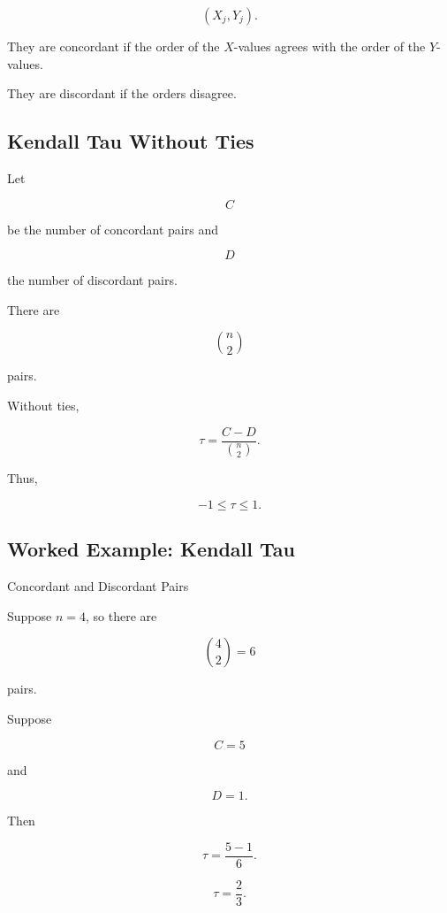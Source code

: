 \[
(X_j,Y_j).
\]

They are concordant if the order of the \(X\)-values agrees with the
order of the \(Y\)-values.

They are discordant if the orders disagree.

\subsection{Kendall Tau Without Ties}
\label{subsec:kendall-no-ties}

Let

\[
C
\]

be the number of concordant pairs and

\[
D
\]

the number of discordant pairs.

There are

\[
\binom{n}{2}
\]

pairs.

Without ties,

\[
\boxed{
\tau
=
\frac{
C-D
}{
\binom{n}{2}
}.
}
\]

Thus,

\[
-1\leq\tau\leq1.
\]

\subsection{Worked Example: Kendall Tau}
\label{subsec:worked-kendall}

\begin{workedexamplebox}{Concordant and Discordant Pairs}

Suppose \(n=4\), so there are

\[
\binom42=6
\]

pairs.

Suppose

\[
C=5
\]

and

\[
D=1.
\]

Then

\[
\tau
=
\frac{5-1}{6}.
\]

\begin{answerbox}
\[
\boxed{
\tau
=
\frac23.
}
\]
\end{answerbox}

\end{workedexamplebox}

